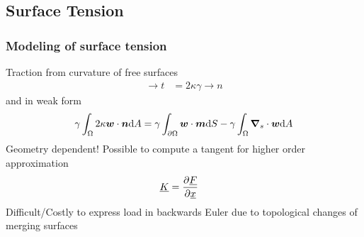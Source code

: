 \documentclass[11pt,mathserif]{beamer}
\begin{document}
\subsection{Surface Tension}
\begin{frame}
 \frametitle{Modeling of surface tension}
 Traction from curvature of free surfaces
 \begin{align}
  \to t &= 2\kappa\gamma \to n
 \end{align}
and in weak form
\begin{align}
 \gamma\int_\Omega 2 \kappa \text{\boldmath $w$}\cdot \text{\boldmath $n$}\mathrm{d}A = \gamma\int_{\partial\Omega} \text{\boldmath $w$}\cdot\text{\boldmath $m$}\mathrm{d}S - \gamma\int_\Omega \text{\boldmath $\nabla$}_s \cdot \text{\boldmath $w$} \mathrm{d}A
 \label{eq:curvature}
\end{align}
 \alert{Geometry dependent!}
 Possible to compute a tangent for higher order approximation
 \begin{align}
  \underline{K} &= \frac{\partial\underline{F}}{\partial\underline{x}}
 \end{align}
 Difficult/Costly to express load in backwards Euler due to topological changes of merging surfaces
\end{frame}
\end{document}
